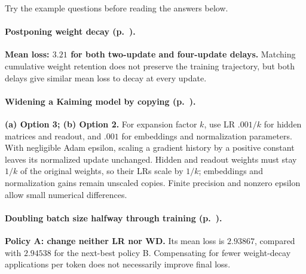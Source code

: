 \clearpage
{}
Try the example questions before reading the answers below.

\paragraph{Postponing weight decay (p.~\pageref{ex:a2-wd-timing}).}
\textbf{Mean loss: $3.21$ for both two-update and four-update delays.}
Matching cumulative weight retention does not preserve the training trajectory,
but both delays give similar mean loss to decay at every update.

\paragraph{Widening a Kaiming model by copying (p.~\pageref{ex:a2-copied-width}).}
\textbf{(a) Option 3; (b) Option 2.}
For expansion factor $k$, use LR $.001/k$ for hidden matrices and readout,
and $.001$ for embeddings and normalization parameters.
With negligible Adam epsilon, scaling a gradient history by a positive constant
leaves its normalized update unchanged. Hidden and readout weights must stay
$1/k$ of the original weights, so their LRs scale by $1/k$; embeddings and
normalization gains remain unscaled copies. Finite precision and nonzero epsilon
allow small numerical differences.

\paragraph{Doubling batch size halfway through training (p.~\pageref{ex:a2-batch-switch}).}
\textbf{Policy A: change neither LR nor WD.}
Its mean loss is $2.93867$, compared with $2.94538$ for the next-best policy B.
Compensating for fewer weight-decay applications per token does not necessarily
improve final loss.

